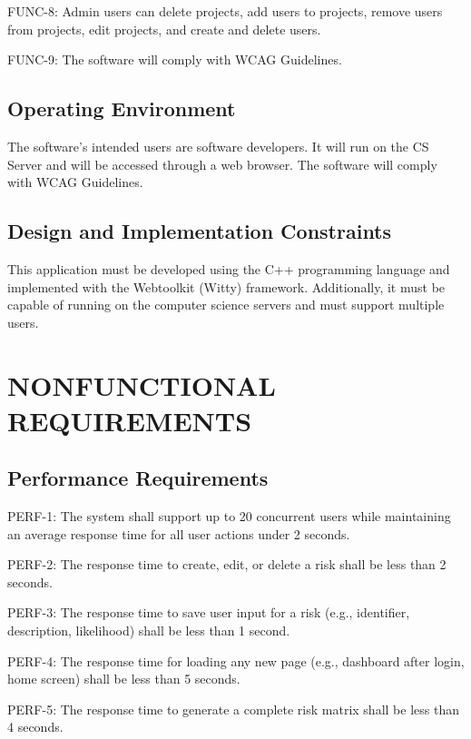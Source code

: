 \documentclass[letterpaper,12pt,oneside,listof=totoc,parskip=full]{scrreprt}
\begin{document}
FUNC-8: Admin users can delete projects, add users to projects, remove users from projects, edit projects, and create and delete users.

FUNC-9: The software will comply with WCAG Guidelines.

\section{Operating Environment}
The software's intended users are software developers. It will run on the CS Server and will be accessed through a web browser. The software will comply with WCAG Guidelines. ~\cite{wcag21}

\section{Design and Implementation Constraints}
This application must be developed using the C++ programming language and implemented with the Webtoolkit (Witty) framework. Additionally, it must be capable of running on the computer science servers and must support multiple users.

\chapter{NONFUNCTIONAL REQUIREMENTS}

\section{Performance Requirements}
PERF-1:     The system shall support up to 20 concurrent users while maintaining an average response time for all user actions under 2 seconds.

PERF-2:     The response time to create, edit, or delete a risk shall be less than 2 seconds.

PERF-3:     The response time to save user input for a risk (e.g., identifier, description, likelihood) shall be less than 1 second.

PERF-4:     The response time for loading any new page (e.g., dashboard after login, home screen) shall be less than 5 seconds.

PERF-5:     The response time to generate a complete risk matrix shall be less than 4 seconds.
\end{document}
